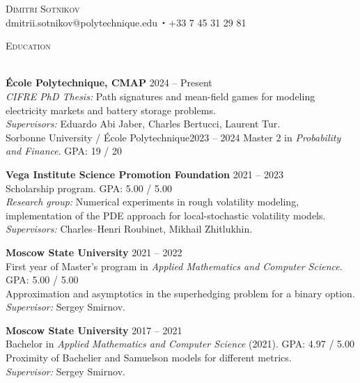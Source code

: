 \documentclass[11pt]{article}
\newcommand{\lineunder}{\vspace*{-8pt} \\ \hspace*{-18pt} \hrulefill \\}
\newcommand{\header}[1]{{\hspace*{-15pt}\vspace*{6pt} \textsc{#1}} \vspace*{-6pt} \lineunder}
\newcommand{\contact}[2]{
\begin{center}
{\LARGE \scshape {#1}}\\
#2
\end{center}
\vspace*{-8pt}
}
\newcommand{\sbt}{\,\begin{picture}(-1,1)(-1,-3)\circle*{2}\end{picture}\ }
\newcommand{\schoolwithcourses}[4]{
 \textbf{#1} \hfill{#2}\\
    #3\\
\vspace*{5pt}
}
\begin{document}

\small
\smallskip
\vspace*{-35pt}

\contact{Dimitri Sotnikov}
{dmitrii.sotnikov@polytechnique.edu $\sbt$ +33 7 45 31 29 81}

\vspace{2mm}

\vspace{2mm}
\header{Education}

\vspace{2mm}
\schoolwithcourses{École Polytechnique, CMAP}{2024 -- Present}
{\textit{CIFRE PhD Thesis:} Path signatures and mean-field games for modeling \\
electricity markets and battery storage problems. \\
{\it Supervisors:} Eduardo Abi Jaber, Charles Bertucci, Laurent Tur.}

\schoolwithcourses{Sorbonne University / École Polytechnique}{2023 -- 2024}
{Master 2 in \textit{Probability and Finance}. GPA: 19 / 20}

\schoolwithcourses{Vega Institute Science Promotion Foundation}{2021 -- 2023}
{Scholarship program. GPA: 5.00 / 5.00}
\vspace{}
{\it Research group:} Numerical experiments in rough volatility modeling, \\
implementation of the PDE approach for local-stochastic volatility models. \\
{\it Supervisors:} Charles--Henri Roubinet, Mikhail Zhitlukhin.

\vspace{2mm}
\schoolwithcourses{Moscow State University}{2021 -- 2022}
{First year of Master's program in \textit{Applied Mathematics and Computer Science}.
GPA: 5.00 / 5.00}

{\it Coursework:} Approximation and asymptotics in the superhedging problem for a binary option. \\
{\it Supervisor:} Sergey Smirnov.

\vspace{2mm}
\schoolwithcourses{Moscow State University}{2017 -- 2021}
{Bachelor in \textit{Applied Mathematics and Computer Science} (2021). 
GPA: 4.97 / 5.00}

{\it Bachelor thesis:} Proximity of Bachelier and Samuelson models for different metrics. \\
{\it Supervisor:} Sergey Smirnov.

\vspace{2mm}
\end{document}
